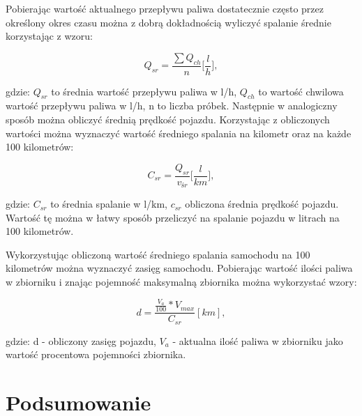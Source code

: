 \documentclass[12pt]{article} %
\numberwithin{equation}{subsection}
\numberwithin{figure}{section}
\numberwithin{table}{section}
\begin{document}
	Pobierając wartość aktualnego przepływu paliwa dostatecznie często przez określony okres czasu można z dobrą dokładnością wyliczyć spalanie średnie korzystając z wzoru:
	
	\begin{equation}
		Q_{sr} = \frac{\sum{Q_{ch}}}{n} \bigg[\frac{l}{h}\bigg],
	\end{equation}		

gdzie: $Q_{sr}$ to średnia wartość przepływu paliwa w l/h, $Q_{ch}$ to wartość chwilowa wartość przepływu paliwa w l/h, n to liczba próbek. Następnie w analogiczny sposób można obliczyć średnią prędkość pojazdu. Korzystając z obliczonych wartości można wyznaczyć wartość średniego spalania na kilometr oraz na każde 100 kilometrów:
	
	\begin{equation}
		C_{sr} = \frac{Q_{sr}}{v_{śr}} \bigg[\frac{l}{km}\bigg],
	\end{equation}

gdzie: $C_{sr}$ to średnia spalanie w l/km, $c_{sr}$ obliczona średnia prędkość pojazdu. Wartość tę można w łatwy sposób przeliczyć na spalanie pojazdu w litrach na 100 kilometrów.

	Wykorzystując obliczoną wartość średniego spalania samochodu na 100 kilometrów można wyznaczyć zasięg samochodu. Pobierając wartość ilości paliwa w zbiorniku i znając pojemność maksymalną zbiornika można wykorzystać wzory:
	
	\begin{equation}
		d = \frac{\frac{V_{a}}{100} * V_{max}}{C_{sr}} [km],
	\end{equation}
	
	gdzie: d - obliczony zasięg pojazdu, $V_{a}$ - aktualna ilość paliwa w zbiorniku jako wartość procentowa pojemności zbiornika.
		
	\newpage
	
	\section{Podsumowanie}
	
	\hspace{0.5cm} 
	
	\newpage	
	
\end{document}
